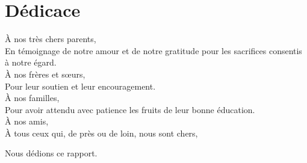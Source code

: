 \chapter*{Dédicace}
\begin{center}
    \vspace{2cm}
\onehalfspacing

À nos très chers parents,\\
En témoignage de notre amour et de notre gratitude pour les sacrifices consentis à notre égard.\\[0.5cm]

À nos frères et sœurs,\\
Pour leur soutien et leur encouragement.\\[0.5cm]

À nos familles,\\
Pour avoir attendu avec patience les fruits de leur bonne éducation.\\[0.5cm]

À nos amis,\\
À tous ceux qui, de près ou de loin, nous sont chers,\\[0.5cm]

\begin{center}
Nous dédions ce rapport.
\end{center}
\end{center}
 
